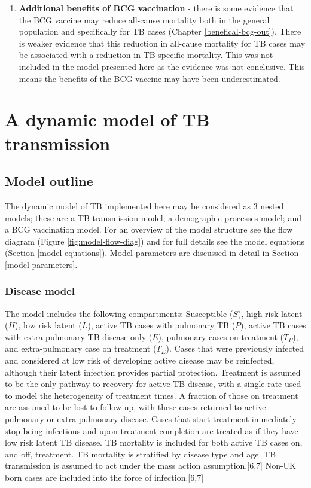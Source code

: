 \documentclass[11pt,twoside]{bristolthesis}
\begin{document}
\begin{enumerate}
  \item
    \textbf{Additional benefits of BCG vaccination} - there is some evidence that the BCG vaccine may reduce all-cause mortality both in the general population and specifically for TB cases (Chapter \ref{benefical-bcg-out}). There is weaker evidence that this reduction in all-cause mortality for TB cases may be associated with a reduction in TB specific mortality. This was not included in the model presented here as the evidence was not conclusive. This means the benefits of the BCG vaccine may have been underestimated.
  \end{enumerate}
  \hypertarget{a-dynamic-model-of-tb-transmission}{%
  \section{A dynamic model of TB transmission}\label{a-dynamic-model-of-tb-transmission}}
  
  \hypertarget{model-outline}{%
  \subsection{Model outline}\label{model-outline}}
  
  The dynamic model of TB implemented here may be considered as 3 nested models; these are a TB transmission model; a demographic processes model; and a BCG vaccination model. For an overview of the model structure see the flow diagram (Figure \ref{fig:model-flow-diag}) and for full details see the model equations (Section \ref{model-equations}). Model parameters are discussed in detail in Section \ref{model-parameters}.
  
  \hypertarget{disease-model}{%
  \subsubsection{Disease model}\label{disease-model}}
  
  The model includes the following compartments: Susceptible (\(S\)), high risk latent (\(H\)), low risk latent (\(L\)), active TB cases with pulmonary TB (\(P\)), active TB cases with extra-pulmonary TB disease only (\(E\)), pulmonary cases on treatment (\(T_P\)), and extra-pulmonary case on treatment (\(T_E\)). Cases that were previously infected and considered at low risk of developing active disease may be reinfected, although their latent infection provides partial protection. Treatment is assumed to be the only pathway to recovery for active TB disease, with a single rate used to model the heterogeneity of treatment times. A fraction of those on treatment are assumed to be lost to follow up, with these cases returned to active pulmonary or extra-pulmonary disease. Cases that start treatment immediately stop being infectious and upon treatment completion are treated as if they have low risk latent TB disease. TB mortality is included for both active TB cases on, and off, treatment. TB mortality is stratified by disease type and age. TB transmission is assumed to act under the mass action assumption.{[}6,7{]} Non-UK born cases are included into the force of infection.{[}6,7{]}
  
\end{document}
